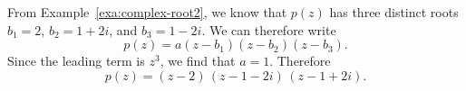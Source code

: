 \begin{solution}
  From Example~\ref{exa:complex-root2}, we know that $p(z)$ has three
  distinct roots $b_1=2$, $b_2=1+2i$, and $b_3=1-2i$. We can therefore
  write
  \begin{equation*}
    p(z) = a(z-b_1)(z-b_2)(z-b_3).
  \end{equation*}
  Since the leading term is $z^3$, we find that $a=1$. Therefore
  \begin{equation*}
    p(z) = (z-2)\,(z-1-2i)\,(z-1+2i).
  \end{equation*}
  \vspace{-2ex}
\end{solution}
